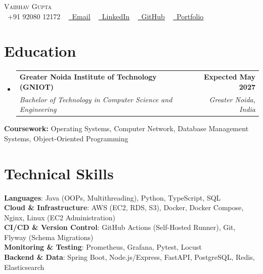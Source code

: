\documentclass[letterpaper,10pt]{article}
\makeatletter
\newcommand{\resumeSubheading}[4]{
  \vspace{-2pt}\item
    \begin{tabular*}{1.0\textwidth}[t]{l@{\extracolsep{\fill}}r}
      \textbf{#1} & \textbf{\small #2} \\
      \textit{\small#3} & \textit{\small #4} \\
    \end{tabular*}\vspace{-7pt}
}
\newcommand{\resumeSubHeadingListStart}{\begin{itemize}[leftmargin=0.0in, label={}]}
\newcommand{\resumeSubHeadingListEnd}{\end{itemize}}
\makeatother
\begin{document}

\begin{center}
    {\Huge \scshape Vaibhav Gupta} \\ \vspace{1pt}
    \small \raisebox{-0.1\height}\faPhone\ +91 92080 12172 ~
    \href{mailto:vaibhv19.business@gmail.com}{\raisebox{-0.2\height}\faEnvelope\ \underline{Email}} ~
    \href{https://linkedin.com/in/vaibhv19}{\raisebox{-0.2\height}\faLinkedin\ \underline{LinkedIn}} ~
    \href{https://github.com/vaibhv19}{\raisebox{-0.2\height}\faGithub\ \underline{GitHub}} ~
    \href{https://vaibhv19.dev}{\raisebox{-0.2\height}\faGlobe\ \underline{Portfolio}}
    \vspace{-8pt}
\end{center}

\section{Education}
  \resumeSubHeadingListStart
    \resumeSubheading
      {Greater Noida Institute of Technology (GNIOT)}{Expected May 2027}
      {Bachelor of Technology in Computer Science and Engineering}{Greater Noida, India}
  \resumeSubHeadingListEnd
  \vspace{-4pt}
  \begin{itemize}[leftmargin=0in, label={}]
    \small{\item{\textbf{Coursework:} Operating Systems, Computer Network, Database Management Systems, Object-Oriented Programming}}
    \vspace{-10pt}
\end{itemize}

\section{Technical Skills}
 \begin{itemize}[leftmargin=0in, label={}]
    \small{\item{
     \textbf{Languages}{: Java (OOPs, Multithreading), Python, TypeScript, SQL} \\
     \textbf{Cloud \& Infrastructure}{: AWS (EC2, RDS, S3), Docker, Docker Compose, Nginx, Linux (EC2 Administration)} \\
     \textbf{CI/CD \& Version Control}{: GitHub Actions (Self-Hosted Runner), Git, Flyway (Schema Migrations)} \\
     \textbf{Monitoring \& Testing}{: Prometheus, Grafana, Pytest, Locust} \\
     \textbf{Backend \& Data}{: Spring Boot, Node.js/Express, FastAPI, PostgreSQL, Redis, Elasticsearch} \\
    }}
 \end{itemize}
 \vspace{-12pt}
\end{document}
